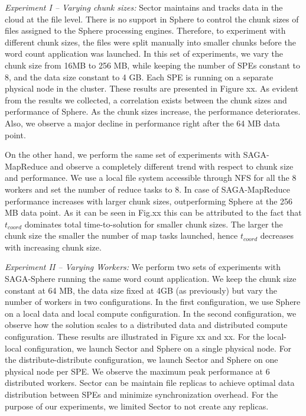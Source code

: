 \documentclass[3p,twocolumn]{elsarticle}
\begin{document}
{\it Experiment I -- Varying chunk sizes:} Sector maintains and tracks
data in the cloud at the file level. There is no support in Sphere to
control the chunk sizes of files assigned to the Sphere processing
engines. Therefore, to experiment with different chunk sizes, the
files were split manually into smaller chunks before the word count
application was launched. In this set of experiments, we vary the
chunk size from 16MB to 256 MB, while keeping the number of SPEs
constant to 8, and the data size constant to 4 GB. Each SPE is running
on a separate physical node in the cluster. These results are
presented in Figure xx. As evident from the results we collected, a
correlation exists between the chunk sizes and performance of Sphere.
As the chunk sizes increase, the performance deteriorates. Also, we
observe a major decline in performance right after the 64 MB data
point. 

On the other hand, we perform the same set of experiments with
SAGA-MapReduce and observe a completely different trend with respect
to chunk size and performance. We use a local file system accessible
through NFS for all the 8 workers and set the number of reduce tasks to 8.
In case of SAGA-MapReduce performance increases with larger chunk sizes,
outperforming Sphere at the 256 MB data point. As it can be seen in Fig.xx
this can be attributed to the fact that $t_{coord}$ dominates total
time-to-solution for smaller chunk sizes. The larger the chunk size the
smaller the number of map tasks launched, hence $t_{coord}$ decreases with
increasing chunk size.


{\it Experiment II -- Varying Workers:} We perform two sets of
experiments with SAGA-Sphere running the same word count application.
We keep the chunk size constant at 64 MB, the
data size fixed at 4GB (as previously) but vary the number of
workers in two configurations. In the first configuration, we use Sphere 
on a local data and local compute configuration. In the second configuration, we 
observe how the solution scales to a distributed data and distributed compute
configuration. These results are illustrated in Figure xx and xx.  For
the local-local configuration, we launch Sector and Sphere on a single
physical node. For the distribute-distribute configuration, we launch
Sector and Sphere on one physical node per SPE.  We observe the
maximum peak performance at 6 distributed workers. Sector can be maintain 
file replicas to achieve optimal data distribution between SPEs and minimize
synchronization overhead. For the purpose of our experiments, we
limited Sector to not create any replicas.
\end{document}
